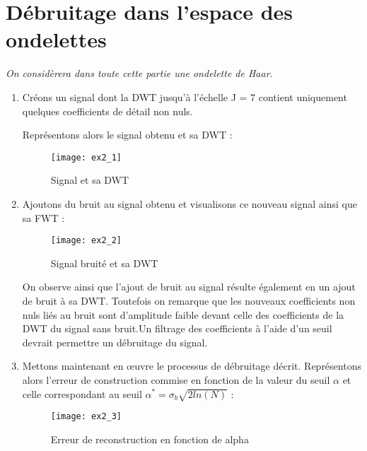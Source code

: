 \documentclass[12pt,a4paper,titlepage]{article}
\begin{document}
    \section{Débruitage dans l'espace des ondelettes}

    \emph{On considèrera dans toute cette partie une ondelette de Haar.}

    \begin{enumerate}
        \item{Créons un signal dont la DWT jusqu'à l'échelle  J = 7 contient
                uniquement quelques coefficients de détail non nuls.

                Représentons alors le signal obtenu et sa DWT :

                \begin{figure}[H]
                    \caption{Signal et sa DWT}
                    \texttt{[image: ex2\_1]}
                    \centering
                \end{figure}
            }

        \item{Ajoutons du bruit au signal obtenu et visualisons ce nouveau
                signal ainsi que sa FWT :

                \begin{figure}[H]
                    \caption{Signal bruité et sa DWT}
                    \texttt{[image: ex2\_2]}
                    \centering
                \end{figure}

                On observe ainsi que l'ajout de bruit au signal résulte
                également en un ajout de bruit à sa DWT. Toutefois on
                remarque que les nouveaux coefficients non nuls liés au
                bruit sont d'amplitude faible devant celle des coefficients
                de la DWT du signal sans bruit.Un filtrage des coefficients
                à l'aide d'un seuil devrait permettre un débruitage du signal.
            }

        \item{Mettons maintenant en œuvre le processus de débruitage décrit.
                Représentons alors l'erreur de construction commise en fonction
                de la valeur du seuil $\alpha$ et celle correspondant au seuil
                $\alpha^* = \sigma_b \sqrt{2 ln(N)}$ :

                \begin{figure}[H]
                    \caption{Erreur de reconstruction en fonction de alpha}
                    \texttt{[image: ex2\_3]}
                    \centering
                \end{figure}
            }


\end{enumerate}
\end{document}
